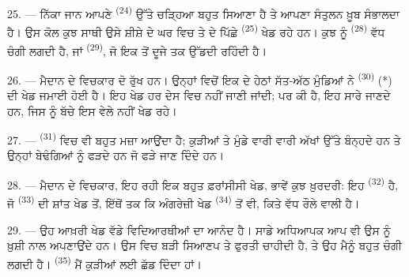 25. --- ਨਿੱਕਾ ਜਾਨ ਆਪਣੇ  \textsuperscript{(24)} ਉੱਤੇ ਚੜ੍ਹਿਆ ਬਹੁਤ
ਸਿਆਣਾ ਹੈ ਤੇ ਆਪਣਾ ਸੰਤੁਲਨ ਖ਼ੂਬ ਸੰਭਾਲਦਾ ਹੈ। ਉਸ ਕੋਲ ਕੁਝ ਸਾਥੀ ਉਸੇ ਸ਼ੀਸ਼ੇ ਦੇ ਘਰ ਵਿਚ
ਤੇ  ਦੇ ਪਿੱਛੇ  \textsuperscript{(25)} ਖੇਡ ਰਹੇ ਹਨ।
ਕੁਝ ਨੂੰ  \textsuperscript{(28)} ਵੱਧ ਚੰਗੀ ਲਗਦੀ ਹੈ, ਜਾਂ
 \textsuperscript{(29)}, ਜੋ ਇਕ  ਤੋਂ ਦੂਜੇ ਤਕ ਉੱਡਦੀ
ਰਹਿੰਦੀ ਹੈ।


26. --- ਮੈਦਾਨ ਦੇ ਵਿਚਕਾਰ ਦੋ ਰੁੱਖ ਹਨ। ਉਨ੍ਹਾਂ ਵਿਚੋਂ ਇਕ ਦੇ ਹੇਠਾਂ ਸੱਤ-ਅੱਠ ਮੁੰਡਿਆਂ
ਨੇ  \textsuperscript{(30)} (*) ਦੀ ਖੇਡ ਜਮਾਈ ਹੋਈ ਹੈ। ਇਹ ਖੇਡ ਹਰ
ਦੇਸ ਵਿਚ ਨਹੀਂ ਜਾਣੀ ਜਾਂਦੀ; ਪਰ  ਕੀ ਹੈ, ਇਹ ਸਾਰੇ ਜਾਣਦੇ ਹਨ,
ਜਿਸ ਨੂੰ ਬੱਚੇ ਇਸ ਵੇਲੇ ਨਹੀਂ ਖੇਡ ਰਹੇ।

\VUsaut{5.0mm}
\VUsaut{3.4mm}

27. ---  \textsuperscript{(31)} ਵਿਚ ਵੀ ਬਹੁਤ ਮਜ਼ਾ ਆਉਂਦਾ ਹੈ;
ਕੁੜੀਆਂ ਤੇ ਮੁੰਡੇ ਵਾਰੀ ਵਾਰੀ ਅੱਖਾਂ ਉੱਤੇ  ਬੰਨ੍ਹਦੇ ਹਨ ਤੇ ਉਨ੍ਹਾਂ
ਬੇਢੰਗਿਆਂ ਨੂੰ ਫੜਦੇ ਹਨ ਜੋ ਫੜੇ ਜਾਣ ਦਿੰਦੇ ਹਨ।

28. --- ਮੈਦਾਨ ਦੇ ਵਿਚਕਾਰ, ਇਹ ਰਹੀ ਇਕ ਬਹੁਤ ਫ਼ਰਾਂਸੀਸੀ ਖੇਡ, ਭਾਵੇਂ ਕੁਝ ਖ਼ੁਰਦਰੀ:
ਇਹ  \textsuperscript{(32)} ਹੈ, ਜੋ  \textsuperscript{(33)}
ਦੀ ਸ਼ਾਂਤ ਖੇਡ ਤੋਂ, ਇੱਥੋਂ ਤਕ ਕਿ ਅੰਗਰੇਜ਼ੀ ਖੇਡ  \textsuperscript{(34)}
ਤੋਂ ਵੀ, ਕਿਤੇ ਵੱਧ ਰੌਲੇ ਵਾਲੀ ਹੈ।

29. --- ਉਹ ਆਖ਼ਰੀ ਖੇਡ ਵੱਡੇ ਵਿਦਿਆਰਥੀਆਂ ਦਾ ਆਨੰਦ ਹੈ। ਸਾਡੇ ਅਧਿਆਪਕ ਆਪ ਵੀ ਉਸ ਨੂੰ
ਖ਼ੁਸ਼ੀ ਨਾਲ ਅਪਣਾਉਂਦੇ ਹਨ। ਉਸ ਵਿਚ ਬੜੀ ਸਿਆਣਪ ਤੇ ਫੁਰਤੀ ਚਾਹੀਦੀ ਹੈ, ਤੇ ਉਹ ਮੈਨੂੰ ਬਹੁਤ
ਚੰਗੀ ਲਗਦੀ ਹੈ।  \textsuperscript{(35)} ਮੈਂ ਕੁੜੀਆਂ ਲਈ ਛੱਡ ਦਿੰਦਾ ਹਾਂ।

